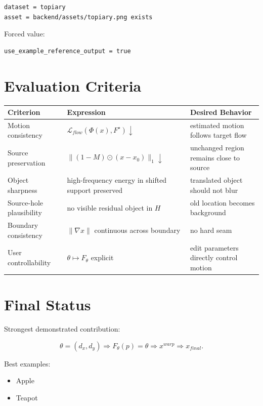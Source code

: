 \documentclass[11pt,a4paper]{article}
\begin{document}
\begin{verbatim}
dataset = topiary
asset = backend/assets/topiary.png exists
\end{verbatim}

Forced value:

\begin{verbatim}
use_example_reference_output = true
\end{verbatim}

\section{Evaluation Criteria}

\begin{tabularx}{\textwidth}{@{}lYY@{}}
\toprule
Criterion & Expression & Desired Behavior \\
\midrule
Motion consistency & \(\mathcal{L}_{flow}(\Phi(x),F^\star)\downarrow\) & estimated motion follows target flow \\
Source preservation & \(\|(1-M)\odot(x-x_0)\|_1\downarrow\) & unchanged region remains close to source \\
Object sharpness & high-frequency energy in shifted support preserved & translated object should not blur \\
Source-hole plausibility & no visible residual object in \(H\) & old location becomes background \\
Boundary consistency & \(\|\nabla x\|\) continuous across boundary & no hard seam \\
User controllability & \(\theta\mapsto F_\theta\) explicit & edit parameters directly control motion \\
\bottomrule
\end{tabularx}

\section{Final Status}

Strongest demonstrated contribution:

\begin{equation}
\theta=(d_x,d_y)
\Rightarrow
F_\theta(p)=\theta
\Rightarrow
x^{warp}
\Rightarrow
x_{final}.
\end{equation}

Best examples:

\begin{itemize}
  \item Apple
  \item Teapot
\end{itemize}
\end{document}
